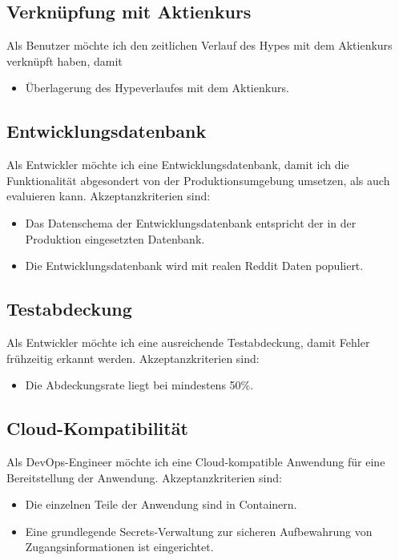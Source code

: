 \documentclass[a4paper, 10pt, conference]{ieeeconf}
\begin{document}
\subsection{Verknüpfung mit Aktienkurs}

Als Benutzer möchte ich den zeitlichen Verlauf des Hypes mit dem Aktienkurs verknüpft haben, damit 
\begin{itemize}
\item Überlagerung des Hypeverlaufes mit dem Aktienkurs.
\end{itemize}

\subsection{Entwicklungsdatenbank}

Als Entwickler möchte ich eine Entwicklungsdatenbank, damit ich die Funktionalität abgesondert von der Produktionsumgebung umsetzen, als auch evaluieren kann.  Akzeptanzkriterien sind:
\begin{itemize}
\item Das Datenschema der Entwicklungsdatenbank entspricht der in der Produktion eingesetzten Datenbank.
\item Die Entwicklungsdatenbank wird mit realen Reddit Daten populiert.
\end{itemize}

\subsection{Testabdeckung}

Als Entwickler möchte ich eine ausreichende Testabdeckung,  damit Fehler frühzeitig erkannt werden.  Akzeptanzkriterien sind:
\begin{itemize}
\item Die Abdeckungsrate liegt bei mindestens 50\%.
\end{itemize}

\subsection{Cloud-Kompatibilität}

Als DevOps-Engineer möchte ich eine Cloud-kompatible Anwendung für eine Bereitstellung der Anwendung.  Akzeptanzkriterien sind:
\begin{itemize}
\item Die einzelnen Teile der Anwendung sind in Containern.
\item Eine grundlegende Secrets-Verwaltung zur sicheren Aufbewahrung von Zugangsinformationen ist eingerichtet.
\end{itemize}
\end{document}
